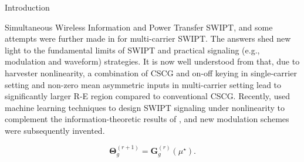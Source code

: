 \begin{section}{Introduction}
\begin{subsection}{Simultaneous Wireless Information and Power Transfer}
SWIPT, and some attempts were further made in \cite{Varasteh2019d} for multi-carrier SWIPT. The answers shed new light to the fundamental limits of SWIPT and practical signaling (e.g., modulation and waveform) strategies. It is now well understood from \cite{Clerckx2018b,Varasteh2020,Varasteh2019d} that, due to harvester nonlinearity, a combination of CSCG and on-off keying in single-carrier setting and non-zero mean asymmetric inputs in multi-carrier setting lead to significantly larger R-E region compared to conventional CSCG. Recently, \cite{Varasteh2020a} used machine learning techniques to design SWIPT signaling under nonlinearity to complement the information-theoretic results of \cite{Varasteh2020}, and new modulation schemes were subsequently invented.
	\end{subsection}


	\begin{equation}
		\mathbf{\Theta}_g^{(r+1)} = \mathbf{G}_g^{(r)}(\mu^\star).
		\label{eq:update_geodesic}
	\end{equation}



\end{section}
